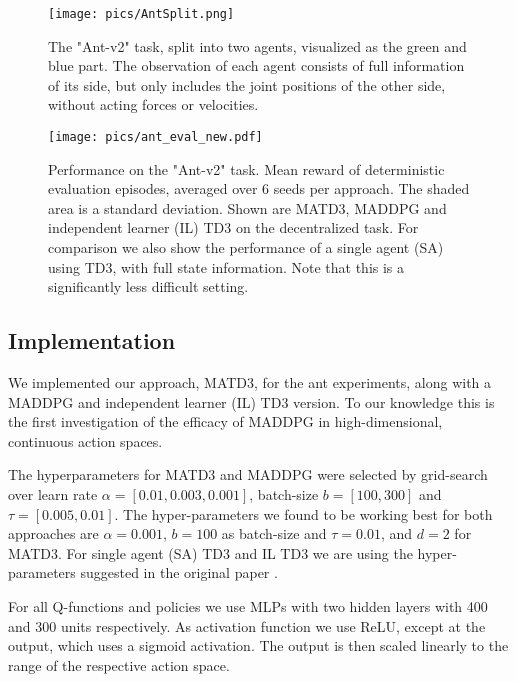 \documentclass{article}
\begin{document}
\begin{figure}[t]
	\begin{minipage}[t]{0.4\textwidth}
		\centering
\texttt{[image: pics/AntSplit.png]}
		\caption{The "Ant-v2" task, split into two agents, visualized as the green and blue part. The observation of each agent consists of full information of its side, but only includes the joint positions of the other side, without acting forces or velocities.}
		\label{fig:antsplit}
	\end{minipage}
	\hfill
	\begin{minipage}[t]{0.57\textwidth}
		\centering
		\texttt{[image: pics/ant\_eval\_new.pdf]}
		\caption{Performance on the "Ant-v2" task. Mean reward of deterministic evaluation episodes, averaged over 6 seeds per approach. The shaded area is a standard deviation. Shown are \gls*{MATD3}, \gls*{MADDPG} and independent learner (IL) TD3 on the decentralized task. For comparison we also show the performance of a single agent (SA) using \gls*{TD3}, with full state information. Note that this is a significantly less difficult setting.}
		\label{fig:antresults}
	\end{minipage}
\end{figure}
\subsection{Implementation}
We implemented our approach, MATD3, for the ant experiments, along with a MADDPG and independent learner (IL) TD3 version. To our knowledge this is the first investigation of the efficacy of MADDPG in high-dimensional, continuous action spaces.

The hyperparameters for \gls*{MATD3} and \gls*{MADDPG} were selected by grid-search over learn rate $\alpha = [0.01, 0.003, 0.001]$, batch-size $ b = [100, 300]$ and $ \tau = [0.005, 0.01]$.
The hyper-parameters we found to be working best for both approaches are $\alpha = 0.001$, $b = 100$ as batch-size and $\tau = 0.01$, and $d=2$ for \gls*{MATD3}.
For single agent (SA) \gls*{TD3} and IL \gls*{TD3} we are using the hyper-parameters suggested in the original paper \cite{Fujimoto2018}.

For all Q-functions and policies we use \glspl*{MLP} with two hidden layers with 400 and 300 units respectively. 
As activation function we use \gls*{ReLU}, except at the output, which uses a sigmoid activation. 
The output is then scaled linearly to the range of the respective action space.
\vspace{-1mm}
\end{document}
